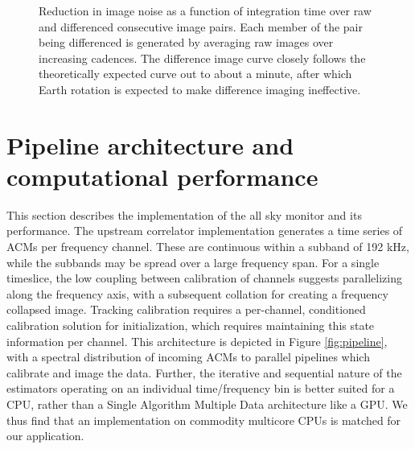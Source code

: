 \documentclass{aa}
\begin{document}
\begin{figure}[tbh]

\caption{\label{fig:Reduction-in-image}Reduction in image noise as a function of
  integration  time over  raw  and differenced  consecutive  image pairs.   Each
  member of the pair being differenced is generated by averaging raw images over
  increasing  cadences.   The  difference   image  curve  closely   follows  the
  theoretically expected curve out to about a minute, after which Earth rotation
  is expected to make difference imaging ineffective.}
\end{figure}

\section{\label{sec:Computational-performance}Pipeline architecture and computational performance}
This  section  describes the  implementation  of the  all  sky  monitor and  its
performance. The  upstream correlator implementation generates a  time series of
ACMs per  frequency channel. These are  continuous within a subband  of 192 kHz,
while  the subbands may  be spread  over a  large frequency  span. For  a single
timeslice,   the  low   coupling  between   calibration  of   channels  suggests
parallelizing along the frequency axis, with a subsequent collation for creating
a  frequency  collapsed image.   Tracking  calibration  requires a  per-channel,
conditioned calibration solution  for initialization, which requires maintaining
this  state information  per channel.  This architecture  is depicted  in Figure
\ref{fig:pipeline}, with  a spectral distribution  of incoming ACMs  to parallel
pipelines  which calibrate  and  image  the data.   Further,  the iterative  and
sequential nature  of the estimators  operating on an  individual time/frequency
bin is  better suited for  a CPU, rather  than a Single Algorithm  Multiple Data
architecture  like a  GPU.  We  thus find  that an  implementation  on commodity
multicore  CPUs is  matched  for our  application.  
\end{document}
